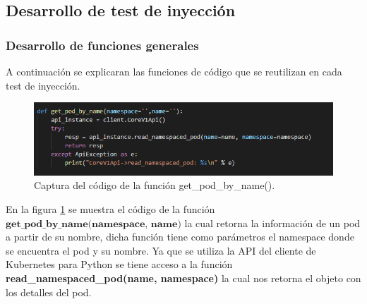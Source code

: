 \subsection{Desarrollo de test de inyección}
 
 
 
 

\subsubsection{Desarrollo de funciones generales}
\par A continuación se explicaran las funciones de código que se reutilizan en cada test de inyección.

\begin{figure}[htpb!]
	\centering
	\includegraphics[width=0.90\columnwidth]{images/captures/codigo/Capture_get_pod_by_name.PNG}
	\caption{Captura del código de la función get\_pod\_by\_name().}
	\label{fig:codi01}
\end{figure}

\par En la figura \ref{fig:codi01} se muestra el código de la función  $\textbf{get\_pod\_by\_name(namespace, name)}$ la cual retorna la información de un pod a partir de su nombre, dicha función tiene como parámetros el namespace donde se encuentra el pod y su nombre. Ya que se utiliza la API del cliente de Kubernetes para Python se tiene acceso a la función \textbf{read\_namespaced\_pod(name, namespace)} la cual nos retorna el objeto con los detalles del pod. \\

